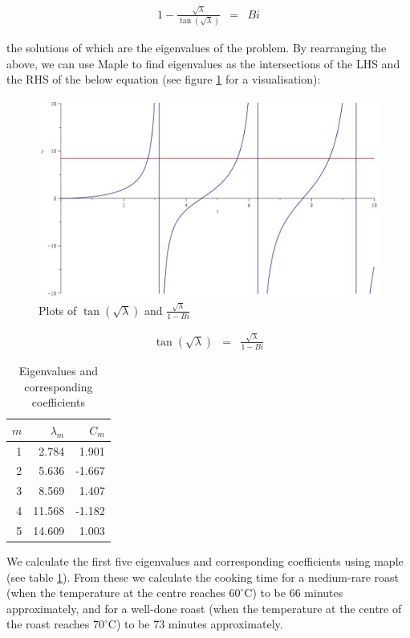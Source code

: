 \documentclass{report}
\begin{document}
\begin{eqnarray*} 
1 - \frac{\sqrt{\lambda}}{\tan(\sqrt{\lambda})} & = & Bi 
\end{eqnarray*}\medskip

the solutions of which are the eigenvalues of the problem. By rearranging the above, we can use Maple to find 
eigenvalues as the intersections of the LHS and the RHS of the below equation  (see figure \ref{fig:ev} for a 
visualisation):\bigskip 

\begin{figure}[b]
\centering
\includegraphics[scale = 0.15]{eigenvalues}
\caption{Plots of $\tan(\sqrt{\lambda})$ and $\frac{\sqrt{\lambda}}{1 - Bi}$}
\label{fig:ev}
\end{figure}

\begin{eqnarray*} 
\tan(\sqrt{\lambda}) & = & \frac{\sqrt{\lambda}}{1 - Bi} 
\end{eqnarray*}\medskip

\begin{table}[h]
\centering
\begin{tabular}{ r | r | r }
$m$ & $\lambda_m$ & $C_m$ \\
\hline
1 &  2.784 &  1.901 \\
2 &  5.636 & -1.667 \\
3 &  8.569 &  1.407 \\
4 & 11.568 & -1.182 \\
5 & 14.609 &  1.003 \\
\end{tabular}
\caption{Eigenvalues and corresponding coefficients}
\label{tab:ec}
\end{table}

We calculate the first five eigenvalues and corresponding coefficients using maple (see table \ref{tab:ec}). 
From these we calculate the cooking time for a medium-rare roast (when the temperature at the centre reaches 
$60^{\circ}\mathrm{C}$) to be $66$ minutes approximately, and for a well-done roast (when the temperature at 
the centre of the roast reaches $70^{\circ}\mathrm{C}$) to be $73$ minutes approximately.\bigskip 
\end{document}
